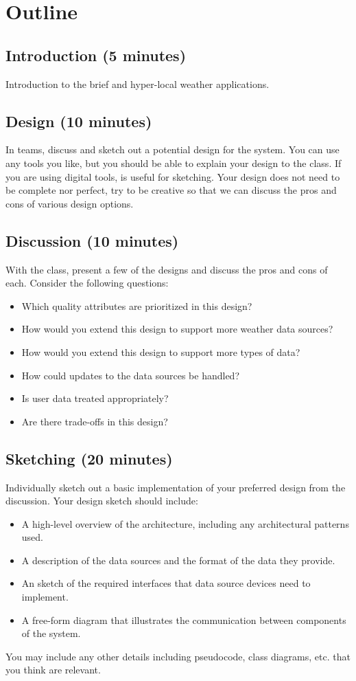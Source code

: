 \documentclass{csse4400}
\begin{document}
\section{Outline}

\subsection*{Introduction (5 minutes)}
Introduction to the brief and hyper-local weather applications.

\subsection*{Design (10 minutes)}
In teams, discuss and sketch out a potential design for the system.
You can use any tools you like, but you should be able to explain your design to the class.
If you are using digital tools,  is useful for sketching.
Your design does not need to be complete nor perfect,
try to be creative so that we can discuss the pros and cons of various design options.

\subsection*{Discussion (10 minutes)}
With the class, present a few of the designs and discuss the pros and cons of each.
Consider the following questions:
\begin{itemize}
\item Which quality attributes are prioritized in this design?
\item How would you extend this design to support more weather data sources?
\item How would you extend this design to support more types of data?
\item How could updates to the data sources be handled?
\item Is user data treated appropriately?
\item Are there trade-offs in this design?
\end{itemize}

\subsection*{Sketching (20 minutes)}
Individually sketch out a basic implementation of your preferred design from the discussion.
Your design sketch should include:
\begin{itemize}
\item A high-level overview of the architecture, including any architectural patterns used.
\item A description of the data sources and the format of the data they provide.
\item An sketch of the required interfaces that data source devices need to implement.
\item A free-form diagram that illustrates the communication between components of the system.
\end{itemize}
You may include any other details including pseudocode, class diagrams, etc. that you think are relevant.
\end{document}
